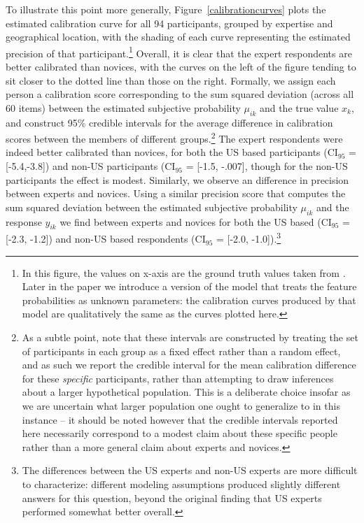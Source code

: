\documentclass[doc]{apa6} %
\begin{document}
To illustrate this point more generally, Figure~\ref{calibrationcurves} plots the estimated calibration curve for all 94 participants, grouped by expertise and geographical location, with the shading of each curve representing the estimated precision of that participant.\footnote{In this figure, the values on x-axis are the ground truth values taken from \protect{}. Later in the paper we introduce a version of the model that treats the feature probabilities as unknown parameters: the calibration curves produced by that model are qualitatively the same as the curves plotted here.} Overall, it is clear that the expert respondents are better calibrated than novices, with the curves on the left of the figure tending to sit closer to the dotted line than those on the right. Formally, we assign each person a calibration score corresponding to the sum squared deviation (across all 60 items) between the estimated subjective probability $\mu_{ik}$ and the true value $x_k$, and construct 95\% credible intervals for the average difference in calibration scores between the members of different groups.\footnote{As a subtle point, note that these intervals are constructed by treating the set of participants in each group as a fixed effect rather than a random effect, and as such we report the credible interval for the mean calibration difference for these {\it specific} participants, rather than attempting to draw inferences about a larger hypothetical population. This is a deliberate choice insofar as we are uncertain what larger population one ought to generalize to in this instance -- it should be noted however that the credible intervals reported here necessarily correspond to a modest claim about these specific people rather than a more general claim about experts and novices.} The expert respondents were indeed better calibrated than novices, for both the US based participants (CI$_{95}$ = [-5.4,-3.8]) and non-US participants (CI$_{95}$ = [-1.5, -.007], though for the non-US participants the effect is modest. Similarly, we observe an difference in precision between experts and novices. Using a similar precision score that computes the sum squared deviation between the estimated subjective probability $\mu_{ik}$ and the response $y_{ik}$ we find between experts and novices for both the US based (CI$_{95}$ = [-2.3, -1.2]) and non-US based respondents (CI$_{95}$ = [-2.0, -1.0]).\footnote{The differences between the US experts and non-US experts are more difficult to characterize: different modeling assumptions produced slightly different answers for this question, beyond the original finding that US experts performed somewhat better overall.}
\end{document}
